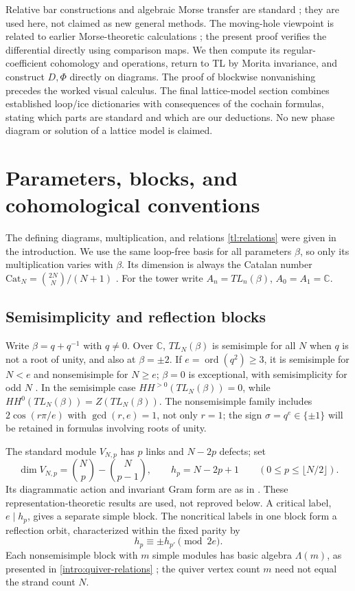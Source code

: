 \documentclass[a4paper,11pt,oneside,reqno]{amsart}
\theoremstyle{definition}
\numberwithin{equation}{section}
\begin{document}
Relative bar constructions and algebraic Morse transfer are standard
\cite{Cibils,CLMS,Skoldberg,JollenbeckWelker,CLZ}; they are used here,
not claimed as new general methods. The moving-hole viewpoint is related to earlier Morse-theoretic
calculations \cite{Lopatkin}; the present proof verifies the
differential directly using comparison maps. We then compute its regular-coefficient
cohomology and operations, return to TL by Morita invariance, and
construct $D,\Phi$ directly on diagrams. The proof of blockwise
nonvanishing precedes the worked visual calculus. The final lattice-model
section combines established loop/ice dictionaries with consequences of
the cochain formulas, stating which parts are standard and which are
our deductions. No new phase diagram or solution of a lattice model
is claimed.





\section{Parameters, blocks, and cohomological conventions}\label{tl:prelim}
The defining diagrams, multiplication, and relations
\eqref{tl:relations} were given in the introduction. We use the
same loop-free basis for all parameters $\beta$, so only its multiplication
varies with $\beta$. Its dimension is always the Catalan number
$\mathrm{Cat}_N=\binom{2N}{N}/(N+1)$ \cite[Theorem~2.4]{RSA}.
For the tower write $A_n=TL_n(\beta)$, $A_0=A_1=\mathbb C$.

\subsection{Semisimplicity and reflection blocks}
Write $\beta=q+q^{-1}$ with $q\ne0$. Over $\mathbb C$, $TL_N(\beta)$
is semisimple for all $N$ when $q$ is not a root of unity, and also
at $\beta=\pm2$. If $e=\operatorname{ord}(q^2)\ge3$, it is
semisimple for $N<e$ and nonsemisimple for $N\ge e$; $\beta=0$
is exceptional, with semisimplicity for odd $N$
\cite[Corollaries~4.6, 4.8 and Proposition~8.2]{RSA}.
In the semisimple case $HH^{>0}(TL_N(\beta))=0$, while
$HH^0(TL_N(\beta))=Z(TL_N(\beta))$.
The nonsemisimple family includes $2\cos(r\pi/e)$ with
$\gcd(r,e)=1$, not only $r=1$; the sign $\sigma=q^e\in\{\pm1\}$
will be retained in formulas involving roots of unity.

The standard module $V_{N,p}$ has $p$ links and $N-2p$ defects;
set
\[
 \dim V_{N,p}=\binom Np-\binom N{p-1},\qquad
 h_p=N-2p+1\qquad(0\le p\le\lfloor N/2\rfloor).
\]
Its diagrammatic action and invariant Gram form are as in
\cite{RSA}. These representation-theoretic results are used,
not reproved below. A critical label, $e\mid h_p$, gives a
separate simple block. The noncritical labels in one block form
a reflection orbit, characterized within the fixed parity by
\begin{equation}\label{tl:blockrule}
 h_p\equiv\pm h_{p'}\pmod{2e}.
\end{equation}
Each nonsemisimple block with $m$ simple modules has basic algebra
$\Lambda(m)$, as presented in \eqref{intro:quiver-relations}
\cite[Section~10]{Westbury}; the quiver vertex count $m$ need not
equal the strand count $N$.
\end{document}
